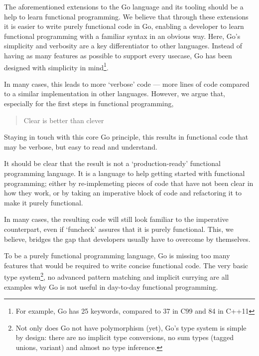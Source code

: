 
The aforementioned extensions to the Go language and its tooling should be a help to learn
functional programming. We believe that through these extensions it is easier to write
purely functional code in Go, enabling a developer to learn functional programming with
a familiar syntax in an obvious way. Here, Go's simplicity and verbosity are a key differentiator
to other languages. Instead of having as many features as possible to support every usecase,
Go has been designed with simplicity in mind\footnote{For example, Go has 25 keywords, compared
to 37 in C99 and 84 in C++11}.

In many cases, this leads to more `verbose' code --- more lines of code compared to a similar
implementation in other languages. However, we argue that, especially for the first steps
in functional programming,

\begin{quote}
Clear is better than clever\autocite{cheney-clear}
\end{quote}

Staying in touch with this core Go principle, this results in functional code that may be
verbose, but easy to read and understand.

It should be clear that the result is not a `production-ready' functional programming language.
It is a language to help getting started with functional programming; either by re-implemeting pieces
of code that have not been clear in how they work, or by taking an imperative block of code
and refactoring it to make it purely functional.

In many cases, the resulting code will still look familiar to the imperative counterpart,
even if `funcheck' assures that it is purely functional. This, we believe, bridges the gap
that developers usually have to overcome by themselves.

To be a purely functional programming language, Go is missing too many features that would be
required to write concise functional code. The very basic type system\footnote{Not only
	does Go not have polymorphism (yet), Go's type system is simple by design: there are no
	implicit type conversions, no sum types (tagged unions, variant) and almost no type inference.
}, no advanced pattern matching and implicit currying are all examples why Go is not useful
in day-to-day functional programming.

